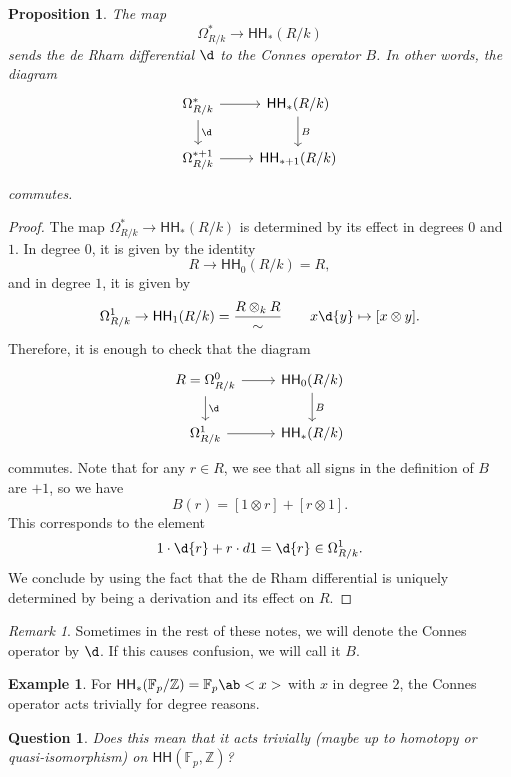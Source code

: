 \documentclass[10pt]{amsart}
\newtheorem{prop}[thm]{Proposition}
\newtheorem{quest}[thm]{Question}
\theoremstyle{definition}
\newtheorem{exm}[thm]{Example}
\theoremstyle{remark}
\newtheorem{rmk}[thm]{Remark}
\theoremstyle{plain}
\theoremstyle{definition}
\theoremstyle{remark}
\newcommand{\Z}{\mathbb{Z}}
\newcommand{\F}{\mathbb{F}}
\newcommand{\ms}[1]{\mathsf{#1}}
\newcommand{\1}{\mathbf{1}}
\newcommand{\2}{\mathbf{2}}
\newcommand{\3}{\mathbf{3}}
\newcommand{\HH}{\ms{HH}}
\begin{document}
\begin{prop}
    The map 
    \[ \Omega^*_{R/k} \to \HH_*(R/k) \]
    sends the de Rham differential $\d$ to the Connes operator $B$. In other words, the diagram
    \begin{equation*}
    \begin{tikzcd}
        \Omega^*_{R/k} \ar{r} \ar{d}{\d} & \HH_*(R/k) \ar{d}{B} \\
        \Omega^{*+1}_{R/k} \ar{r} & \HH_{*+1}(R/k)
    \end{tikzcd}
    \end{equation*}
    commutes.
\end{prop}

\begin{proof}
    The map $\Omega^*_{R/k} \to \HH_*(R/k)$ is determined by its effect in degrees $0$ and $1$. In degree $0$, it is given by the identity
    \[ R \to \HH_0(R/k) = R, \]
    and in degree $1$, it is given by
    \[ \Omega^1_{R/k} \to \HH_1(R/k) = \frac{R \otimes_k R}{\sim} \qquad x \d{y} \mapsto [x \otimes y]. \]
    Therefore, it is enough to check that the diagram
    \begin{equation*}
    \begin{tikzcd}
        R = \Omega^0_{R/k} \ar{r} \ar{d}{\d} & \HH_0(R/k) \ar{d}{B} \\
        \Omega^1_{R/k} \ar{r} & \HH_*(R/k)
    \end{tikzcd}
    \end{equation*}
    commutes. Note that for any $r \in R$, we see that all signs in the definition of $B$ are $+1$, so we have
    \[ B(r) = [1 \otimes r] + [r \otimes 1]. \]
    This corresponds to the element
    \[ 1 \cdot \d{r} + r \cdot d{1} = \d{r} \in \Omega^1_{R/k}. \]
    We conclude by using the fact that the de Rham differential is uniquely determined by being a derivation and its effect on $R$.
\end{proof}

\begin{rmk}
    Sometimes in the rest of these notes, we will denote the Connes operator by $\d$. If this causes confusion, we will call it $B$.
\end{rmk}

\begin{exm}
    For $\HH_*(\F_p/\Z) = \F_p \ab<x>$ with $x$ in degree $2$, the Connes operator acts trivially for degree reasons.
\end{exm}

\begin{quest}
    Does this mean that it acts trivially (maybe up to homotopy or quasi-isomorphism) on $\HH(\F_p, \Z)$?
\end{quest}
\end{document}
